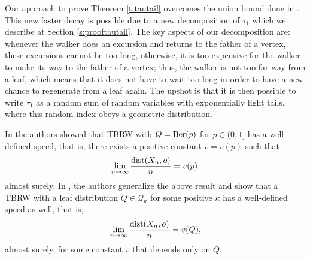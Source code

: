 \documentclass[a4paper]{amsart}
\newcommand{\D}[1]{{\rm dist}(X_{#1},o)}
\begin{document}
Our approach to prove Theorem \ref{t:tautail} overcomes the union bound done in \cite{ribeiro2023}. This new faster decay is possible due to a new decomposition of $\tau_1$ which we describe at Section \ref{s:prooftautail}. The key aspects of our decomposition are: whenever the walker does an excursion and returns to the father of a vertex, these excursions cannot be too long, otherwise, it is too expensive for the walker to make its way to the father of a vertex; thus, the walker is not too far way from a leaf, which means that it does not have to wait too long in order to have a new chance to regenerate from a leaf again. The upshot is that it is then possible to write $\tau_1$ as a random sum of random variables with exponentially light tails, where this random index obeys a geometric distribution. 

In \cite{figueiredo2017building} the authors showed that TBRW with $Q = {\rm Ber}(p)$ for $p \in (0,1]$ has a well-defined speed, that is, there exists a positive constant $v = v(p)$ such that
$$
\lim_{n\to \infty }\frac{\D{n}}{n} = v(p),
$$
almost surely. In \cite{ribeiro2023}, the authors generalize the above result and show that a TBRW with a leaf distribution $Q \in \mathcal{Q}_\kappa$ for some positive $\kappa$ has a well-defined speed as well, that is,
\begin{equation}\label{eq:vQ}
\lim_{n\to \infty }\frac{\D{n}}{n} = v(Q),
\end{equation}
almost surely, for some constant $v$ that depends only on $Q$.
\end{document}
